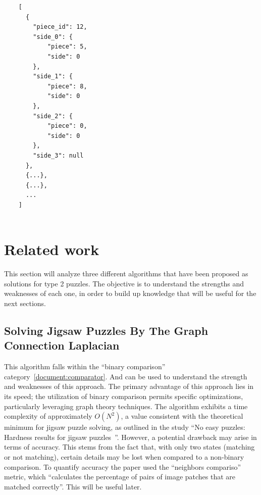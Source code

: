 \documentclass{article}
\begin{document}
\begin{minipage}{\textwidth}
  \begin{lstlisting}
    [
      {
        "piece_id": 12,
        "side_0": {
            "piece": 5,
            "side": 0
        },
        "side_1": {
            "piece": 8,
            "side": 0
        },
        "side_2": {
            "piece": 0,
            "side": 0
        },
        "side_3": null
      },
      {...},
      {...},
      ...
    ]
  
  \end{lstlisting}
\end{minipage}


\section{Related work}\label{document:related_work}
This section will analyze three different algorithms that have been
proposed as solutions for type 2 puzzles.
The objective is to understand the strengths and weaknesses of each one,
in order to build up knowledge that will be useful for the next sections.


\subsection{Solving Jigsaw Puzzles By The Graph Connection Laplacian~\cite{GCL}}
This algorithm falls within the ``binary comparison'' category~\cref{document:comparator}.
And can be used to understand the strength and weaknesses
of this approach.\newline
The primary advantage of this approach lies in its speed;
the utilization of binary comparison permits specific optimizations,
particularly leveraging graph theory techniques.\newline
The algorithm exhibits a time complexity of approximately \(O(N^2)\),
a value consistent with the theoretical minimum for
jigsaw puzzle solving, as outlined in the study
``No easy puzzles: Hardness results for jigsaw puzzles~\cite{ON2Claim}''.\newline
However, a potential drawback may arise in terms of accuracy.
This stems from the fact that, with only two states
(matching or not matching),
certain details may be lost when compared to a non-binary comparison. 
To quantify accuracy the paper used the ``neighbors compariso'' metric,
which ``calculates the percentage of pairs of image patches that are matched correctly''.
This will be useful later.\label{document:GCL}
\end{document}
